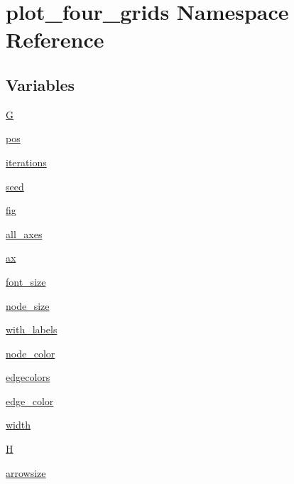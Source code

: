 \hypertarget{namespaceplot__four__grids}{}\section{plot\+\_\+four\+\_\+grids Namespace Reference}
\label{namespaceplot__four__grids}
\subsection*{Variables}
\begin{DoxyCompactItemize}
\item 
\hyperlink{namespaceplot__four__grids_aa93cf2d641de5df2d8ecfb59a7d593af}{G}
\item 
\hyperlink{namespaceplot__four__grids_ad3560b16ef0f0da56dd5e5883a565e02}{pos}
\item 
\hyperlink{namespaceplot__four__grids_a79508e0a31d24275d2e96de6cd1a7bce}{iterations}
\item 
\hyperlink{namespaceplot__four__grids_a89277461038183f61ca437224a8b8611}{seed}
\item 
\hyperlink{namespaceplot__four__grids_a37f2503c90892ecd964624db5d8a2382}{fig}
\item 
\hyperlink{namespaceplot__four__grids_a2645d3ec49a77fbb4f81153a42a7c372}{all\+\_\+axes}
\item 
\hyperlink{namespaceplot__four__grids_a04ba7d4f733ef4d4482b7130fad17146}{ax}
\item 
\hyperlink{namespaceplot__four__grids_a2bb477d6c6435b07f325b6e13b827d69}{font\+\_\+size}
\item 
\hyperlink{namespaceplot__four__grids_a9b13ecbd43bac1f023d4bb0a063b8128}{node\+\_\+size}
\item 
\hyperlink{namespaceplot__four__grids_a144da1a059cc48378e7993c4ae1d12f9}{with\+\_\+labels}
\item 
\hyperlink{namespaceplot__four__grids_a06e711514f6a355f7baa4739bef42de1}{node\+\_\+color}
\item 
\hyperlink{namespaceplot__four__grids_afb73fa3f49db7b04cb7fb11fc9fd34c0}{edgecolors}
\item 
\hyperlink{namespaceplot__four__grids_ae9819825c483aad63534c88f82f18fb9}{edge\+\_\+color}
\item 
\hyperlink{namespaceplot__four__grids_af0ef5935f043440b94cf0a3d89389cb0}{width}
\item 
\hyperlink{namespaceplot__four__grids_ade619dd0f3999ec6d68bdcb9f7dc61b0}{H}
\item 
\hyperlink{namespaceplot__four__grids_a75cbfcd87df85430a59d4d08e4e17d7c}{arrowsize}
\end{DoxyCompactItemize}


